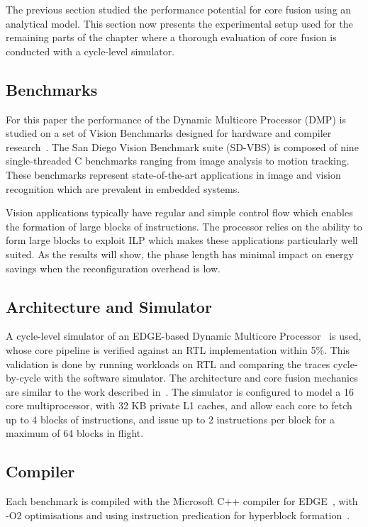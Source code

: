 The previous section studied the performance potential for core fusion using an analytical model.
This section now presents the experimental setup used for the remaining parts of the chapter where a thorough evaluation of core fusion is conducted with a cycle-level simulator.

\subsection{Benchmarks}

For this paper the performance of the Dynamic Multicore Processor (DMP) is studied on a set of Vision Benchmarks designed for hardware and compiler research~\cite{sdvbs}.
The San Diego Vision Benchmark suite (SD-VBS) is composed of nine single-threaded C benchmarks ranging from image analysis to motion tracking.
These benchmarks represent state-of-the-art applications in image and vision recognition which are prevalent in embedded systems.

Vision applications typically have regular and simple control flow which enables the formation of large blocks of instructions.
The processor relies on the ability to form large blocks to exploit ILP which makes these applications particularly well suited.
As the results will show, the phase length has minimal impact on energy savings when the reconfiguration overhead is low.

\subsection{Architecture and Simulator}

A cycle-level simulator of an EDGE-based Dynamic Multicore Processor~\cite{e2} is used, whose core pipeline is verified against an RTL implementation within 5\%. 
This validation is done by running workloads on RTL and comparing the traces cycle-by-cycle with the software simulator.
The architecture and core fusion mechanics are similar to the work described in~\cite{kim2007tflex,putnam2010e2}.
The simulator is configured to model a 16 core multiprocessor, with 32 KB private L1 caches, and allow each core to fetch up to 4 blocks of instructions, 
and issue up to 2 instructions per block for a maximum of 64 blocks in flight.


\subsection{Compiler}
Each benchmark is compiled with the Microsoft C++ compiler for EDGE~\cite{e2}, with -O2 optimisations and using instruction predication for hyperblock formation~\cite{smith2006edge}.

